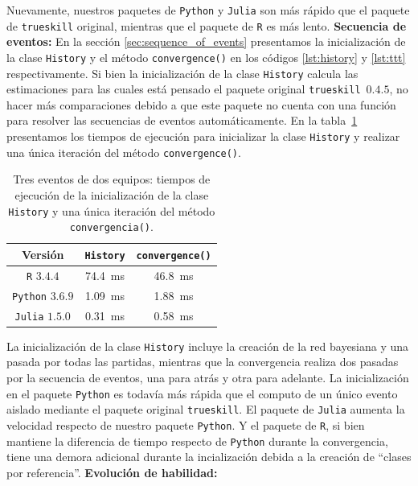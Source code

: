 \documentclass[a4paper,11pt]{book}
\theoremstyle{definition}
\begin{document}
%
Nuevamente, nuestros paquetes de \texttt{Python} y \texttt{Julia} son más rápido que el paquete de \texttt{trueskill} original, mientras que el paquete de \texttt{R} es más lento.
\textbf{Secuencia de eventos:}
%
En la sección \ref{sec:sequence_of_events} presentamos la inicialización de la clase \texttt{History} y el método \texttt{convergence()} en los códigos \ref{lst:history} y \ref{lst:ttt} respectivamente.
%
Si bien la inicialización de la clase \texttt{History} calcula las estimaciones para las cuales está pensado el paquete original \texttt{trueskill}~$0.4.5$, no hacer más comparaciones debido a que este paquete no cuenta con una función para resolver las secuencias de eventos automáticamente.
%
En la tabla~\ref{Tab:Sequence} presentamos los tiempos de ejecución para inicializar la clase \texttt{History} y realizar una única iteración del método \texttt{convergence()}.
%
\begin{table}[ht!] \centering
    \begin{tabular}{ccc}
        Versión & \texttt{History} & \texttt{convergence()} \\ \hline
        \texttt{R} $3.4.4$        & \SI{74.4}{\ms}   & \SI{46.8}{\ms} \\
        \hline
        \texttt{Python} $3.6.9$   & \SI{1.09}{\ms}    & \SI{1.88}{\ms} \\
        \hline
        \texttt{Julia} $1.5.0$    &  \SI{0.31}{\ms}   & \SI{0.58}{\ms} \\
        \hline
    \end{tabular}
    \caption{
     Tres eventos de dos equipos: tiempos de ejecución de la inicialización de la clase \texttt{History} y una única iteración del método \texttt{convergencia()}.
    }
    \label{Tab:Sequence}
\end{table}
%
La inicialización de la clase \texttt{History} incluye la creación de la red bayesiana y una pasada por todas las partidas, mientras que la convergencia realiza dos pasadas por la secuencia de eventos, una para atrás y otra para adelante.
%
La inicialización en el paquete \texttt{Python} es todavía más rápida que el computo de un único evento aislado mediante el paquete original \texttt{trueskill}.
%
El paquete de \texttt{Julia} aumenta la velocidad respecto de nuestro paquete \texttt{Python}.
%
Y el paquete de \texttt{R}, si bien mantiene la diferencia de tiempo respecto de \texttt{Python} durante la convergencia, tiene una demora adicional durante la incialización debida a la creación de ``clases por referencia''.
\textbf{Evolución de habilidad:}
\end{document}
